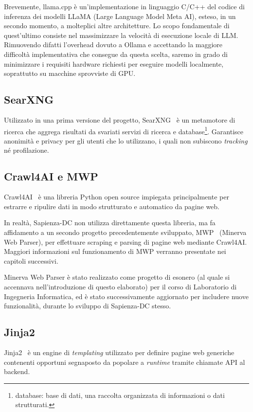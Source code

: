 Brevemente, llama.cpp è un'implementazione in linguaggio C/C++ del codice di inferenza dei modelli LLaMA (Large Language Model Meta AI), esteso, in un secondo momento, a molteplici altre architetture. Lo scopo fondamentale di quest'ultimo consiste nel massimizzare la velocità di esecuzione locale di LLM. Rimuovendo difatti l'overhead dovuto a Ollama e accettando la maggiore difficoltà implementativa che consegue da questa scelta, saremo in grado di minimizzare i requisiti hardware richiesti per eseguire modelli localmente, soprattutto su macchine sprovviste di GPU.     

\subsection{SearXNG}
Utilizzato in una prima versione del progetto, SearXNG~\cite{searxng_docs} è un metamotore di ricerca che aggrega risultati da svariati servizi di ricerca e database\footnote{database: base di dati, una raccolta organizzata di informazioni o dati strutturati.}. Garantisce anonimità e privacy per gli utenti che lo utilizzano, i quali non subiscono \textit{tracking} né profilazione.   

\subsection{Crawl4AI e MWP}
Crawl4AI~\cite{crawl4ai_docs} è una libreria Python open source impiegata principalmente per estrarre e ripulire dati in modo strutturato e automatico da pagine web.

In realtà, Sapienza-DC non utilizza direttamente questa libreria, ma fa affidamento a un secondo progetto precedentemente sviluppato, MWP~\cite{mwp_repo} (Minerva Web Parser), per effettuare scraping e parsing di pagine web mediante Crawl4AI. Maggiori informazioni sul funzionamento di MWP verranno presentate nei capitoli successivi.

Minerva Web Parser è stato realizzato come progetto di esonero (al quale si accennava nell'introduzione di questo elaborato) per il corso di Laboratorio di Ingegneria Informatica, ed è stato successivamente aggiornato per includere nuove funzionalità, durante lo sviluppo di Sapienza-DC stesso.  
\subsection{Jinja2}
Jinja2~\cite{jinja2_docs} è un engine di \textit{templating} utilizzato per definire pagine web generiche contenenti opportuni segnaposto da popolare a \textit{runtime} tramite chiamate API al backend.

